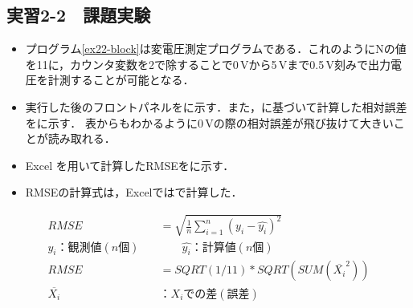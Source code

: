 \clearpage
\subsection{実習2-2　課題実験}
\begin{itemize}
	\item プログラム\ref{ex22-block}は変電圧測定プログラムである．これのようにNの値を11に，カウンタ変数を2で除することで0\,\rm{V}から5\,\rm{V}まで0.5\,\rm{V}刻みで出力電圧を計測することが可能となる．
	\item 実行した後のフロントパネルをに示す．また，に基づいて計算した相対誤差をに示す．
表からもわかるように0\,\rm{V}の際の相対誤差が飛び抜けて大きいことが読み取れる．	
	\item Excel を用いて計算したRMSEをに示す\cite{lm-evaluation}．
	\item RMSEの計算式は，Excelではで計算した．
\end{itemize}

\begin{align}
RMSE&=\sqrt{\frac{1}{n}\sum_{i=1}^{n}(y_{i}-\hat{y_{i}})^{2}}\label{eq:lm-evaluation}\\
y_{i}：観測値(n個)\quad&\qquad\hat{y_{i}}：計算値(n個)\nonumber\\
RMSE&=SQRT(1/11)*SQRT(SUM(\overline{X_{i}}^{2}))\label{eq:eRMSE}\\
\overline{X_{i}}&：X_{i}での差(誤差)\nonumber
\end{align}

